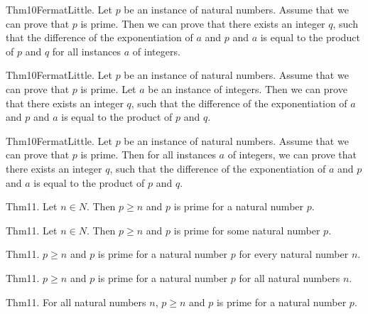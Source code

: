 \documentclass{article}
\begin{document}
Thm10FermatLittle. Let $p$ be an instance of natural numbers. Assume that we can prove that $p$ is prime. Then we can prove that there exists an integer $q$, such that the difference of the exponentiation of $a$ and $p$ and $a$ is equal to the product of $p$ and $q$ for all instances $a$ of integers.

Thm10FermatLittle. Let $p$ be an instance of natural numbers. Assume that we can prove that $p$ is prime. Let $a$ be an instance of integers. Then we can prove that there exists an integer $q$, such that the difference of the exponentiation of $a$ and $p$ and $a$ is equal to the product of $p$ and $q$.

Thm10FermatLittle. Let $p$ be an instance of natural numbers. Assume that we can prove that $p$ is prime. Then for all instances $a$ of integers, we can prove that there exists an integer $q$, such that the difference of the exponentiation of $a$ and $p$ and $a$ is equal to the product of $p$ and $q$.

Thm11. Let $n \in N$. Then $p \geq n$ and $p$ is prime for a natural number $p$.

Thm11. Let $n \in N$. Then $p \geq n$ and $p$ is prime for some natural number $p$.

Thm11. $p \geq n$ and $p$ is prime for a natural number $p$ for every natural number $n$.

Thm11. $p \geq n$ and $p$ is prime for a natural number $p$ for all natural numbers $n$.

Thm11. For all natural numbers $n$, $p \geq n$ and $p$ is prime for a natural number $p$.
\end{document}
